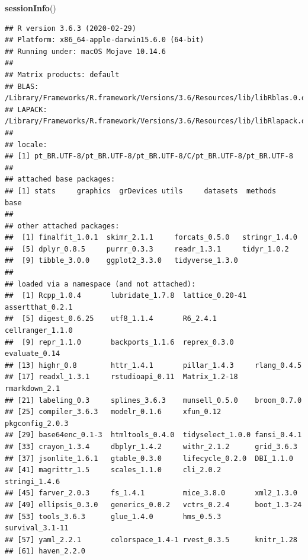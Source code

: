 \documentclass[]{article}
\newenvironment{Shaded}{\begin{snugshade}}{\end{snugshade}}
\newcommand{\KeywordTok}[1]{\textcolor[rgb]{0.13,0.29,0.53}{\textbf{#1}}}
\newcommand{\NormalTok}[1]{#1}
\begin{document}
\begin{Shaded}
\begin{Highlighting}[]
\KeywordTok{sessionInfo}\NormalTok{()}
\end{Highlighting}
\end{Shaded}

\begin{verbatim}
## R version 3.6.3 (2020-02-29)
## Platform: x86_64-apple-darwin15.6.0 (64-bit)
## Running under: macOS Mojave 10.14.6
## 
## Matrix products: default
## BLAS:   /Library/Frameworks/R.framework/Versions/3.6/Resources/lib/libRblas.0.dylib
## LAPACK: /Library/Frameworks/R.framework/Versions/3.6/Resources/lib/libRlapack.dylib
## 
## locale:
## [1] pt_BR.UTF-8/pt_BR.UTF-8/pt_BR.UTF-8/C/pt_BR.UTF-8/pt_BR.UTF-8
## 
## attached base packages:
## [1] stats     graphics  grDevices utils     datasets  methods   base     
## 
## other attached packages:
##  [1] finalfit_1.0.1  skimr_2.1.1     forcats_0.5.0   stringr_1.4.0  
##  [5] dplyr_0.8.5     purrr_0.3.3     readr_1.3.1     tidyr_1.0.2    
##  [9] tibble_3.0.0    ggplot2_3.3.0   tidyverse_1.3.0
## 
## loaded via a namespace (and not attached):
##  [1] Rcpp_1.0.4       lubridate_1.7.8  lattice_0.20-41  assertthat_0.2.1
##  [5] digest_0.6.25    utf8_1.1.4       R6_2.4.1         cellranger_1.1.0
##  [9] repr_1.1.0       backports_1.1.6  reprex_0.3.0     evaluate_0.14   
## [13] highr_0.8        httr_1.4.1       pillar_1.4.3     rlang_0.4.5     
## [17] readxl_1.3.1     rstudioapi_0.11  Matrix_1.2-18    rmarkdown_2.1   
## [21] labeling_0.3     splines_3.6.3    munsell_0.5.0    broom_0.7.0     
## [25] compiler_3.6.3   modelr_0.1.6     xfun_0.12        pkgconfig_2.0.3 
## [29] base64enc_0.1-3  htmltools_0.4.0  tidyselect_1.0.0 fansi_0.4.1     
## [33] crayon_1.3.4     dbplyr_1.4.2     withr_2.1.2      grid_3.6.3      
## [37] jsonlite_1.6.1   gtable_0.3.0     lifecycle_0.2.0  DBI_1.1.0       
## [41] magrittr_1.5     scales_1.1.0     cli_2.0.2        stringi_1.4.6   
## [45] farver_2.0.3     fs_1.4.1         mice_3.8.0       xml2_1.3.0      
## [49] ellipsis_0.3.0   generics_0.0.2   vctrs_0.2.4      boot_1.3-24     
## [53] tools_3.6.3      glue_1.4.0       hms_0.5.3        survival_3.1-11 
## [57] yaml_2.2.1       colorspace_1.4-1 rvest_0.3.5      knitr_1.28      
## [61] haven_2.2.0
\end{verbatim}
\end{document}
